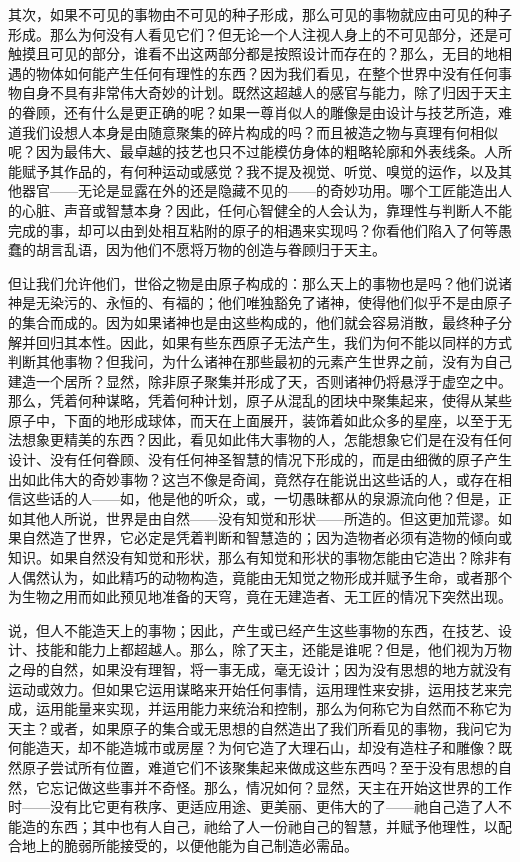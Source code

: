 其次，如果不可见的事物由不可见的种子形成，那么可见的事物就应由可见的种子形成。那么为何没有人看见它们？但无论一个人注视人身上的不可见部分，还是可触摸且可见的部分，谁看不出这两部分都是按照设计而存在的？那么，无目的地相遇的物体如何能产生任何有理性的东西？因为我们看见，在整个世界中没有任何事物自身不具有非常伟大奇妙的计划。既然这超越人的感官与能力，除了归因于天主的眷顾，还有什么是更正确的呢？如果一尊肖似人的雕像是由设计与技艺所造，难道我们设想人本身是由随意聚集的碎片构成的吗？而且被造之物与真理有何相似呢？因为最伟大、最卓越的技艺也只不过能模仿身体的粗略轮廓和外表线条。人所能赋予其作品的，有何种运动或感觉？我不提及视觉、听觉、嗅觉的运作，以及其他器官——无论是显露在外的还是隐藏不见的——的奇妙功用。哪个工匠能造出人的心脏、声音或智慧本身？因此，任何心智健全的人会认为，靠理性与判断人不能完成的事，却可以由到处相互粘附的原子的相遇来实现吗？你看他们陷入了何等愚蠢的胡言乱语，因为他们不愿将万物的创造与眷顾归于天主。\par

但让我们允许他们，世俗之物是由原子构成的：那么天上的事物也是吗？他们说诸神是无染污的、永恒的、有福的；他们唯独豁免了诸神，使得他们似乎不是由原子的集合而成的。因为如果诸神也是由这些构成的，他们就会容易消散，最终种子分解并回归其本性。因此，如果有些东西原子无法产生，我们为何不能以同样的方式判断其他事物？但我问，为什么诸神在那些最初的元素产生世界之前，没有为自己建造一个居所？显然，除非原子聚集并形成了天，否则诸神仍将悬浮于虚空之中。那么，凭着何种谋略，凭着何种计划，原子从混乱的团块中聚集起来，使得从某些原子中，下面的地形成球体，而天在上面展开，装饰着如此众多的星座，以至于无法想象更精美的东西？因此，看见如此伟大事物的人，怎能想象它们是在没有任何设计、没有任何眷顾、没有任何神圣智慧的情况下形成的，而是由细微的原子产生出如此伟大的奇妙事物？这岂不像是奇闻，竟然存在能说出这些话的人，或存在相信这些话的人——如，他是他的听众，或，一切愚昧都从的泉源流向他？但是，正如其他人所说，世界是由自然——没有知觉和形状——所造的。但这更加荒谬。如果自然造了世界，它必定是凭着判断和智慧造的；因为造物者必须有造物的倾向或知识。如果自然没有知觉和形状，那么有知觉和形状的事物怎能由它造出？除非有人偶然认为，如此精巧的动物构造，竟能由无知觉之物形成并赋予生命，或者那个为生物之用而如此预见地准备的天穹，竟在无建造者、无工匠的情况下突然出现。\par

说，但人不能造天上的事物；因此，产生或已经产生这些事物的东西，在技艺、设计、技能和能力上都超越人。那么，除了天主，还能是谁呢？但是，他们视为万物之母的自然，如果没有理智，将一事无成，毫无设计；因为没有思想的地方就没有运动或效力。但如果它运用谋略来开始任何事情，运用理性来安排，运用技艺来完成，运用能量来实现，并运用能力来统治和控制，那么为何称它为自然而不称它为天主？或者，如果原子的集合或无思想的自然造出了我们所看见的事物，我问它为何能造天，却不能造城市或房屋？为何它造了大理石山，却没有造柱子和雕像？既然原子尝试所有位置，难道它们不该聚集起来做成这些东西吗？至于没有思想的自然，它忘记做这些事并不奇怪。那么，情况如何？显然，天主在开始这世界的工作时——没有比它更有秩序、更适应用途、更美丽、更伟大的了——祂自己造了人不能造的东西；其中也有人自己，祂给了人一份祂自己的智慧，并赋予他理性，以配合地上的脆弱所能接受的，以便他能为自己制造必需品。\par

